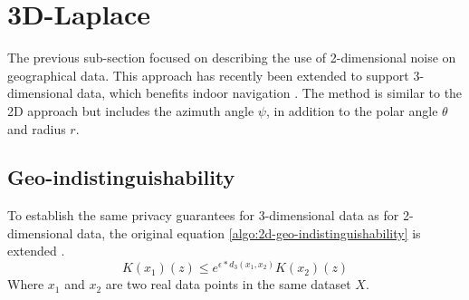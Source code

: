 \section{3D-Laplace}
The previous sub-section focused on describing the use of 2-dimensional noise on geographical data.
This approach has recently been extended to support 3-dimensional data, which benefits indoor navigation \citep{9646489}.
The method is similar to the 2D approach but includes the azimuth angle $\psi$, in addition to the polar angle $\theta$ and radius $r$.

\subsection{Geo-indistinguishability}
To establish the same privacy guarantees for 3-dimensional data as for 2-dimensional data, the original equation \ref{algo:2d-geo-indistinguishability} is extended \citep{9646489}.
\begin{equation}
  K(x_1)(z) \le e^{\epsilon * d_3(x_1, x_2)} K(x_2)(z)
  \label{algo:3d-geo-indistinguishability}
\end{equation}
Where $x_1$ and $x_2$ are two real data points in the same dataset $X$.
